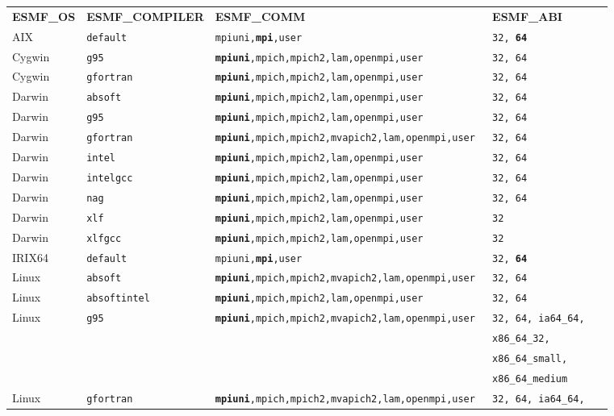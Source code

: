 \begin{tabular}{lllll}
  {\bfseries\footnotesize ESMF\_OS} &{\bfseries\footnotesize ESMF\_COMPILER} & {\bfseries\footnotesize ESMF\_COMM} & {\bfseries\footnotesize ESMF\_ABI} \\

AIX     &\tt default     &\tt mpiuni,{\bf mpi},user      &\tt 32, {\bf 64} \\
Cygwin  &\tt g95         &\tt {\bf mpiuni},mpich,mpich2,lam,openmpi,user &\tt 32, 64 \\
Cygwin  &\tt gfortran    &\tt {\bf mpiuni},mpich,mpich2,lam,openmpi,user &\tt 32, 64 \\
Darwin  &\tt absoft      &\tt {\bf mpiuni},mpich,mpich2,lam,openmpi,user &\tt 32, 64 \\
Darwin  &\tt g95         &\tt {\bf mpiuni},mpich,mpich2,lam,openmpi,user &\tt 32, 64 \\
Darwin  &\tt gfortran    &\tt {\bf mpiuni},mpich,mpich2,mvapich2,lam,openmpi,user &\tt 32, 64 \\
Darwin  &\tt intel       &\tt {\bf mpiuni},mpich,mpich2,lam,openmpi,user &\tt 32, 64 \\
Darwin  &\tt intelgcc    &\tt {\bf mpiuni},mpich,mpich2,lam,openmpi,user &\tt 32, 64 \\
Darwin  &\tt nag         &\tt {\bf mpiuni},mpich,mpich2,lam,openmpi,user &\tt 32, 64 \\
Darwin  &\tt xlf         &\tt {\bf mpiuni},mpich,mpich2,lam,openmpi,user &\tt 32 \\
Darwin  &\tt xlfgcc      &\tt {\bf mpiuni},mpich,mpich2,lam,openmpi,user &\tt 32 \\
IRIX64  &\tt default     &\tt mpiuni,{\bf mpi},user     &\tt 32, {\bf 64} \\
Linux   &\tt absoft      &\tt {\bf mpiuni},mpich,mpich2,mvapich2,lam,openmpi,user &\tt 32, 64 \\
Linux   &\tt absoftintel &\tt {\bf mpiuni},mpich,mpich2,lam,openmpi,user &\tt 32, 64  \\
Linux   &\tt g95         &\tt {\bf mpiuni},mpich,mpich2,mvapich2,lam,openmpi,user &\tt 32, 64, ia64\_64, \\
        &                &                              &\tt x86\_64\_32, \\
        &                &                              &\tt x86\_64\_small, \\
        &                &                              &\tt x86\_64\_medium \\
Linux   &\tt gfortran    &\tt {\bf mpiuni},mpich,mpich2,mvapich2,lam,openmpi,user &\tt 32, 64, ia64\_64, \\

\end{tabular}
